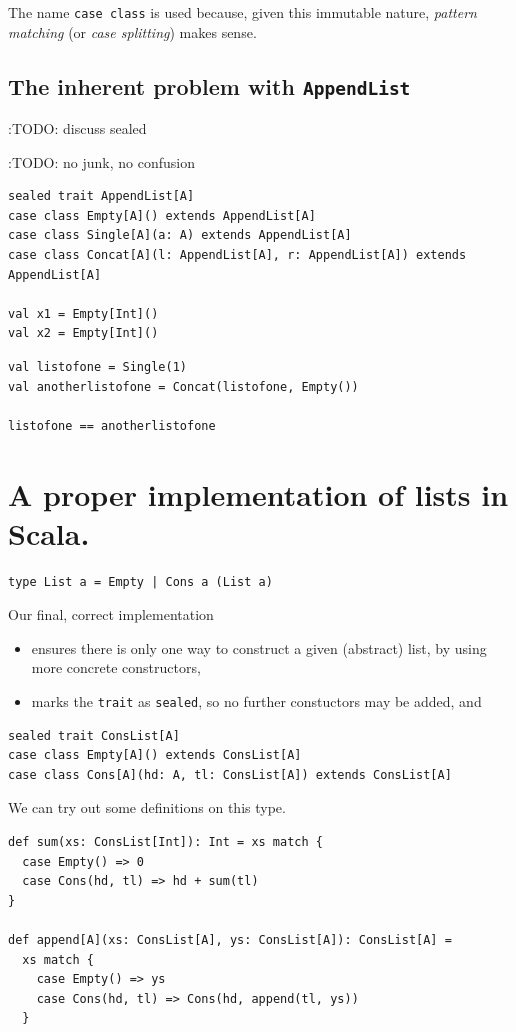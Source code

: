\documentclass[11pt]{article}
\begin{document}
The name \texttt{case class} is used because,
given this immutable nature,
\emph{pattern matching} (or \emph{case splitting})
makes sense.

\subsection{The inherent problem with \texttt{AppendList}}
\label{sec:org7293ef1}
:TODO: discuss sealed

:TODO: no junk, no confusion

\begin{verbatim}
sealed trait AppendList[A]
case class Empty[A]() extends AppendList[A]
case class Single[A](a: A) extends AppendList[A]
case class Concat[A](l: AppendList[A], r: AppendList[A]) extends AppendList[A]

val x1 = Empty[Int]()
val x2 = Empty[Int]()
\end{verbatim}

\begin{verbatim}
val listofone = Single(1)
val anotherlistofone = Concat(listofone, Empty())

listofone == anotherlistofone
\end{verbatim}

\section{A proper implementation of lists in Scala.}
\label{sec:org8922f55}
\begin{verbatim}
type List a = Empty | Cons a (List a)
\end{verbatim}

Our final, correct implementation
\begin{itemize}
\item ensures there is only one way to construct a given (abstract) list,
by using more concrete constructors,
\item marks the \texttt{trait} as \texttt{sealed}, so no further constuctors may be added, and
\end{itemize}
\begin{verbatim}
sealed trait ConsList[A]
case class Empty[A]() extends ConsList[A]
case class Cons[A](hd: A, tl: ConsList[A]) extends ConsList[A]
\end{verbatim}

We can try out some definitions on this type.
\begin{verbatim}
def sum(xs: ConsList[Int]): Int = xs match {
  case Empty() => 0
  case Cons(hd, tl) => hd + sum(tl)
}

def append[A](xs: ConsList[A], ys: ConsList[A]): ConsList[A] =
  xs match {
    case Empty() => ys
    case Cons(hd, tl) => Cons(hd, append(tl, ys))
  }
\end{verbatim}
\end{document}
